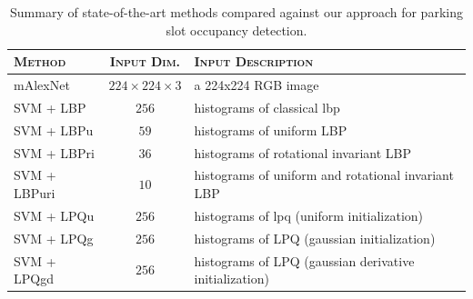 \begin{table}
    \begin{tabularx}{\linewidth}{lcX}
        \toprule
        \textsc{Method} & \textsc{Input Dim.}     & \textsc{Input Description} \\
        \midrule
        mAlexNet         & $224\times 224\times 3$ & a 224x224 RGB image \\
        SVM + LBP        & $256$                     & histograms of classical \acrfull{lbp}~\cite{ojala2002multiresolution} \\
        SVM + LBPu       & $59$                      & histograms of uniform LBP~\cite{ojala2002multiresolution} \\
        SVM + LBPri      & $36$                      & histograms of rotational invariant LBP~\cite{ojala2002multiresolution}  \\
        SVM + LBPuri     & $10$                      & histograms of uniform and rotational invariant LBP~\cite{ojala2002multiresolution} \\
        SVM + LPQu       & $256$                     & histograms of \acrfull{lpq} (uniform initialization)~\cite{ojansivu2008blur} \\
        SVM + LPQg       & $256$                     & histograms of LPQ (gaussian initialization)~\cite{rahtu2012local} \\
        SVM + LPQgd      & $256$                     & histograms of LPQ (gaussian derivative initialization)~\cite{rahtu2012local} \\
        \bottomrule
     \end{tabularx}
     \caption{Summary of state-of-the-art methods compared against our approach for parking slot occupancy detection.}
     \label{tab:mini:methods}
\end{table}

